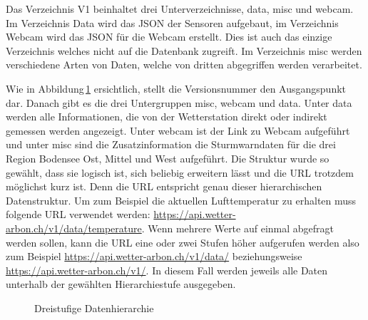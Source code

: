 Das Verzeichnis V1 beinhaltet drei Unterverzeichnisse, data, misc und webcam. Im Verzeichnis Data wird das JSON der Sensoren aufgebaut, im Verzeichnis Webcam wird das JSON für die Webcam erstellt. Dies ist auch das einzige Verzeichnis welches nicht auf die Datenbank zugreift. Im Verzeichnis misc werden verschiedene Arten von Daten, welche von dritten abgegriffen werden verarbeitet.


\begin{itemize*}
\item
\item
\item
\end{itemize*}

Wie in Abbildung\,\ref{img:hierarchie} ersichtlich, stellt die Versionsnummer den Ausgangspunkt dar. Danach gibt es die drei Untergruppen misc, webcam und data. Unter data werden alle Informationen, die von der Wetterstation direkt oder indirekt gemessen werden angezeigt. Unter webcam ist der Link zu Webcam aufgeführt und unter misc sind die Zusatzinformation die Sturmwarndaten für die drei Region Bodensee Ost, Mittel und West aufgeführt. Die Struktur wurde so gewählt, dass sie logisch ist, sich beliebig erweitern lässt und die URL trotzdem möglichst kurz ist. Denn die URL entspricht genau dieser hierarchischen Datenstruktur. Um zum Beispiel die aktuellen Lufttemperatur zu erhalten muss folgende URL verwendet werden: \url{https://api.wetter-arbon.ch/v1/data/temperature}. Wenn mehrere Werte auf einmal abgefragt werden sollen, kann die URL eine oder zwei Stufen höher aufgerufen werden also zum Beispiel \url{https://api.wetter-arbon.ch/v1/data/} beziehungsweise \url{https://api.wetter-arbon.ch/v1/}. In diesem Fall werden jeweils alle Daten unterhalb der gewählten Hierarchiestufe ausgegeben.


\begin{figure}[htbp!]
	\centering
	\caption{Dreistufige Datenhierarchie}
	\label{img:hierarchie}
\end{figure}

